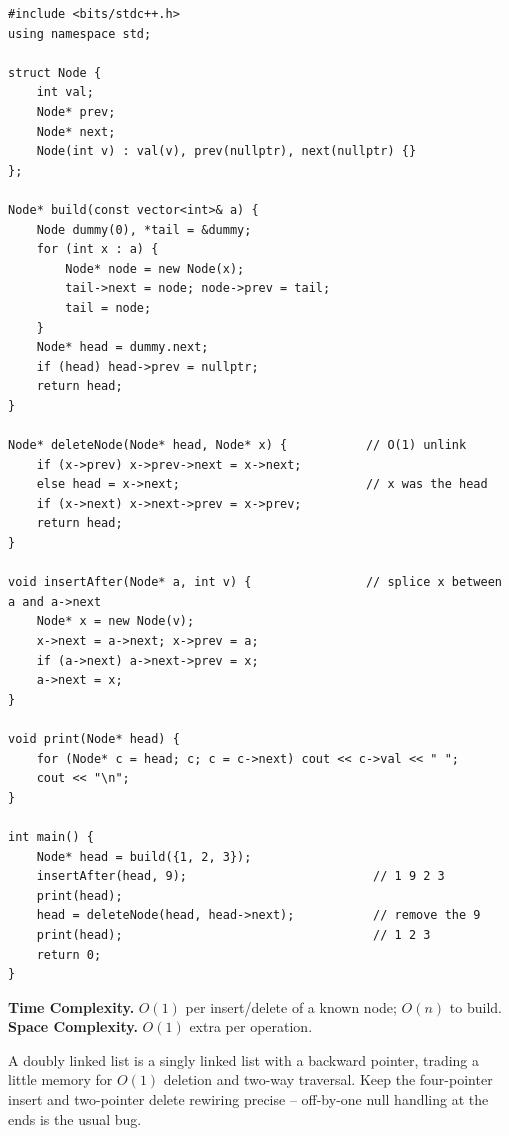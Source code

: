 \begin{lstlisting}
#include <bits/stdc++.h>
using namespace std;

struct Node {
    int val;
    Node* prev;
    Node* next;
    Node(int v) : val(v), prev(nullptr), next(nullptr) {}
};

Node* build(const vector<int>& a) {
    Node dummy(0), *tail = &dummy;
    for (int x : a) {
        Node* node = new Node(x);
        tail->next = node; node->prev = tail;
        tail = node;
    }
    Node* head = dummy.next;
    if (head) head->prev = nullptr;
    return head;
}

Node* deleteNode(Node* head, Node* x) {           // O(1) unlink
    if (x->prev) x->prev->next = x->next;
    else head = x->next;                          // x was the head
    if (x->next) x->next->prev = x->prev;
    return head;
}

void insertAfter(Node* a, int v) {                // splice x between a and a->next
    Node* x = new Node(v);
    x->next = a->next; x->prev = a;
    if (a->next) a->next->prev = x;
    a->next = x;
}

void print(Node* head) {
    for (Node* c = head; c; c = c->next) cout << c->val << " ";
    cout << "\n";
}

int main() {
    Node* head = build({1, 2, 3});
    insertAfter(head, 9);                          // 1 9 2 3
    print(head);
    head = deleteNode(head, head->next);           // remove the 9
    print(head);                                   // 1 2 3
    return 0;
}
\end{lstlisting}

\begin{complexitybox}
\textbf{Time Complexity.} $O(1)$ per insert/delete of a known node; $O(n)$
to build. \textbf{Space Complexity.} $O(1)$ extra per operation.
\end{complexitybox}

\begin{takeawaybox}
A doubly linked list is a singly linked list with a backward pointer,
trading a little memory for $O(1)$ deletion and two-way traversal. Keep the
four-pointer insert and two-pointer delete rewiring precise -- off-by-one
null handling at the ends is the usual bug.
\end{takeawaybox}
